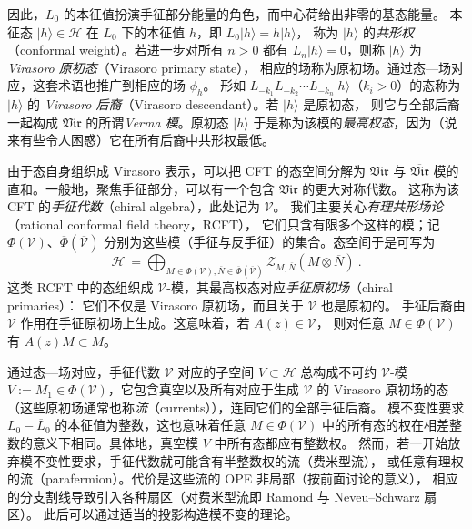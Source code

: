 \documentclass[11pt,a4paper,fontset=windows]{ctexart}
\numberwithin{equation}{section}
\newcommand{\vir}{\mathfrak{Vir}}
\begin{document}
因此，$L_0$ 的本征值扮演手征部分能量的角色，而中心荷给出非零的基态能量。
本征态 $|h\rangle\in\mathcal{H}$ 在 $L_0$ 下的本征值 $h$，即 $L_0|h\rangle=h|h\rangle$，
称为 $|h\rangle$ 的\emph{共形权}（conformal weight）。若进一步对所有 $n>0$ 都有
$L_n|h\rangle=0$，则称 $|h\rangle$ 为\emph{Virasoro 原初态}（Virasoro primary state），
相应的场称为原初场。通过态—场对应，这套术语也推广到相应的场 $\phi_h$。
形如 $L_{-k_1}L_{-k_2}\cdots L_{-k_n}|h\rangle$（$k_i>0$）的态称为 $|h\rangle$ 的
\emph{Virasoro 后裔}（Virasoro descendant）。若 $|h\rangle$ 是原初态，
则它与全部后裔一起构成 $\vir$ 的所谓\emph{Verma 模}。原初态 $|h\rangle$
于是称为该模的\emph{最高权态}，因为（说来有些令人困惑）它在所有后裔中共形权最低。

由于态自身组织成 Virasoro 表示，可以把 CFT 的态空间分解为 $\vir$ 与 $\overline{\vir}$
模的直和。一般地，聚焦手征部分，可以有一个包含 $\vir$ 的更大对称代数。
这称为该 CFT 的\emph{手征代数}（chiral algebra），此处记为 $\mathcal{V}$。
我们主要关心\emph{有理共形场论}（rational conformal field theory，RCFT），
它们只含有限多个这样的模；记 $\Phi(\mathcal{V})$、$\overline{\Phi}(\overline{\mathcal{V}})$
分别为这些模（手征与反手征）的集合。态空间于是可写为
\begin{equation}
\label{eq:split_modules_hilbert_space}
\mathcal{H}~=\bigoplus_{M\in\Phi(\mathcal{V}),\overline{N}\in\overline{\Phi}(\overline{\mathcal{V}})}\mathcal{Z}_{M,\overline{N}}\left(M\otimes\overline{N}\right)~.
\end{equation}
这类 RCFT 中的态组织成 $\mathcal{V}$-模，其最高权态对应\emph{手征原初场}（chiral primaries）：
它们不仅是 Virasoro 原初场，而且关于 $\mathcal{V}$ 也是原初的。
手征后裔由 $\mathcal{V}$ 作用在手征原初场上生成。这意味着，若 $A(z)\in\mathcal{V}$，
则对任意 $M\in\Phi(\mathcal{V})$ 有 $A(z)M\subset M$。


通过态—场对应，手征代数 $\mathcal{V}$ 对应的子空间 $V\subset\mathcal{H}$ 总构成不可约
$\mathcal{V}$-模 $V:=M_1\in\Phi(\mathcal{V})$，它包含真空以及所有对应于生成 $\mathcal{V}$
的 Virasoro 原初场的态（这些原初场通常也称\emph{流}（currents）），连同它们的全部手征后裔。
模不变性要求 $L_0-\overline{L}_0$ 的本征值为整数，这也意味着任意 $M\in\Phi(\mathcal{V})$
中的所有态的权在相差整数的意义下相同。具体地，真空模 $V$ 中所有态都应有整数权。
然而，若一开始放弃模不变性要求，手征代数就可能含有半整数权的流（费米型流），
或任意有理权的流（parafermion）。代价是这些流的 OPE 非局部（按前面讨论的意义），
相应的分支割线导致引入各种扇区（对费米型流即 Ramond 与 Neveu–Schwarz 扇区）。
此后可以通过适当的投影构造模不变的理论。
\end{document}
